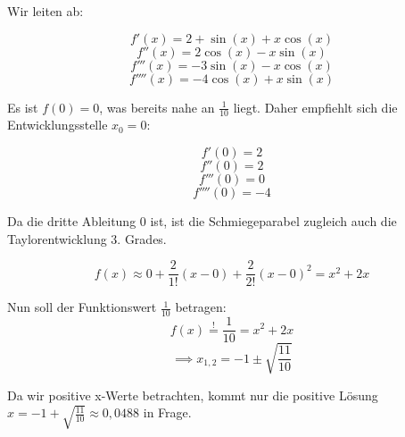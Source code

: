 \item Wir leiten ab:

$$f'(x) = 2+\sin(x)+x\cos(x)$$
$$f''(x) = 2\cos(x)-x\sin(x)$$
$$f'''(x) = -3\sin(x)-x\cos(x)$$
$$f''''(x) = -4\cos(x)+x\sin(x)$$

Es ist $f(0) = 0$, was bereits nahe an $\frac{1}{10}$ liegt. Daher empfiehlt sich die Entwicklungsstelle $x_0=0$:

$$f'(0) = 2$$
$$f''(0) = 2$$
$$f'''(0) = 0$$
$$f''''(0) = -4$$

Da die dritte Ableitung $0$ ist, ist die Schmiegeparabel zugleich auch die Taylorentwicklung 3. Grades.

$$f(x) \approx 0 + \frac{2}{1!}(x-0) + \frac{2}{2!}(x-0)^2 = x^2+2x$$

Nun soll der Funktionswert $\frac{1}{10}$ betragen:
$$f(x) \stackrel{!}{=} \frac{1}{10} = x^2+2x$$
$$\implies x_{1,2} = -1 \pm \sqrt{\frac{11}{10}}$$

Da wir positive x-Werte betrachten, kommt nur die positive Lösung $x = -1 + \sqrt{\frac{11}{10}} \approx 0,0488$ in Frage.

